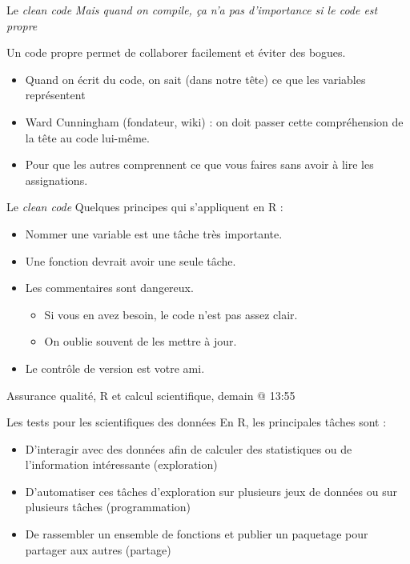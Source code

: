 \documentclass[11pt]{beamer}
\begin{document}
\begin{frame}{Le \textit{clean code}}
\textit{Mais quand on compile, ça n'a pas d'importance si le code est propre}

Un code propre permet de collaborer facilement et éviter des bogues. 
\begin{itemize}
    \item Quand on écrit du code, on sait (dans notre tête) ce que les variables représentent
    \item Ward Cunningham (fondateur, wiki) : on doit passer cette compréhension de la tête au code lui-même.
    \item Pour que les autres comprennent ce que vous faires sans avoir à lire les assignations. 
\end{itemize}
\end{frame}

\begin{frame}{Le \textit{clean code}}
Quelques principes qui s'appliquent en \textsf{R} : 
\begin{itemize}
\item Nommer une variable est une tâche très importante. 
\item Une fonction devrait avoir une seule tâche. 
\item Les commentaires sont dangereux. 
\begin{itemize}
\item Si vous en avez besoin, le code n'est pas assez clair. 
\item On oublie souvent de les mettre à jour. 
\end{itemize}
\item Le contrôle de version est votre ami. 
\end{itemize}
Assurance qualité, R et calcul scientifique, demain @ 13:55 
\end{frame}

\begin{frame}{Les tests pour les scientifiques des données}
En \textsf{R}, les principales tâches sont :
\begin{itemize}
\item D'interagir avec des données afin de calculer des statistiques ou de l'information intéressante (exploration)
\item D'automatiser ces tâches d'exploration sur plusieurs jeux de données ou sur plusieurs tâches (programmation)
\item De rassembler un ensemble de fonctions et publier un paquetage pour partager aux autres (partage)
\end{itemize}
\end{frame}
\end{document}
